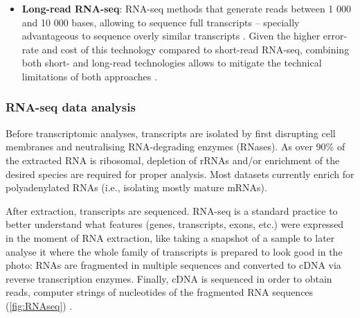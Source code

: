 \begin{itemize}
	\item \textbf{Long-read RNA-seq}: RNA-seq methods that generate reads between 1 000 and 10 000 bases, allowing to sequence full transcripts -- specially advantageous to sequence overly similar transcripts \cite{conesa:2016vw}. Given the higher error-rate and cost of this technology compared to short-read RNA-seq, combining both short- and long-read technologies allows to mitigate the technical limitations of both approaches \cite{conesa:2016vw}.
\end{itemize}

\subsubsection{RNA-seq data analysis}

Before transcriptomic analyses, transcripts are isolated by first disrupting cell membranes and neutralising RNA-degrading enzymes (RNases). As over 90\% of the extracted RNA is ribosomal, depletion of rRNAs and/or enrichment of the desired species are required for proper analysis. Most datasets currently enrich for polyadenylated RNAs (i.e., isolating mostly mature mRNAs).


After extraction, transcripts are sequenced. RNA-seq is a standard practice to better understand what features (genes, transcripts, exons, etc.) were expressed in the moment of RNA extraction, like taking a snapshot of a sample to later analyse it where the whole family of transcripts is prepared to look good in the photo: RNAs are fragmented in multiple sequences and converted to cDNA via reverse transcription enzymes. Finally, cDNA is sequenced in order to obtain reads, computer strings of nucleotides of the fragmented RNA sequences (\autoref{fig:RNAseq}) \cite{conesa:2016vw}.

